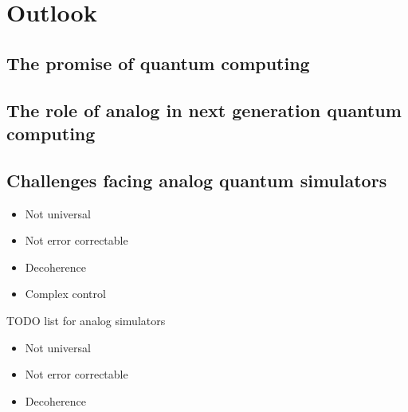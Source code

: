 \chapter[Outlook]{Outlook}

\section{The promise of quantum computing}

\section{The role of analog in next generation quantum computing}

\section{Challenges facing analog quantum simulators}

\begin{itemize}
\item Not universal
\item Not error correctable
\item Decoherence
\item Complex control
\end{itemize}

TODO list for analog simulators
\begin{itemize}
    \item Not universal
    \item Not error correctable
    \item Decoherence
\end{itemize}



